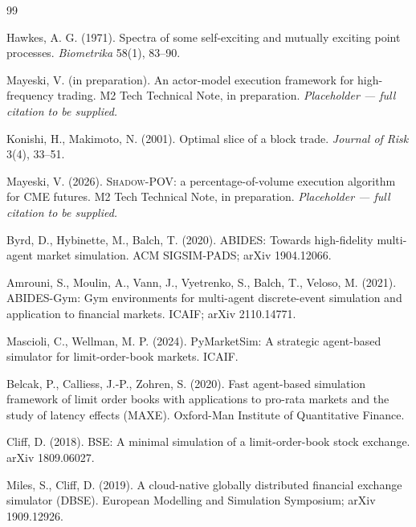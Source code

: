 \documentclass[11pt]{article}
\newcommand{\shadowpov}{\textsc{Shadow-POV}}
\begin{document}
\begin{thebibliography}{99}

Hawkes, A. G. (1971).
\newblock Spectra of some self-exciting and mutually exciting point processes.
\newblock \emph{Biometrika} 58(1), 83--90.

Mayeski, V. (in preparation).
\newblock An actor-model execution framework for high-frequency trading.
\newblock M2 Tech Technical Note, in preparation.
\newblock \emph{Placeholder --- full citation to be supplied.}

Konishi, H., Makimoto, N. (2001).
\newblock Optimal slice of a block trade.
\newblock \emph{Journal of Risk} 3(4), 33--51.

Mayeski, V. (2026).
\newblock \shadowpov{}: a percentage-of-volume execution algorithm for CME futures.
\newblock M2 Tech Technical Note, in preparation.
\newblock \emph{Placeholder --- full citation to be supplied.}

Byrd, D., Hybinette, M., Balch, T. (2020).
ABIDES: Towards high-fidelity multi-agent market simulation.
ACM SIGSIM-PADS; arXiv 1904.12066.

Amrouni, S., Moulin, A., Vann, J., Vyetrenko, S., Balch, T., Veloso, M. (2021).
ABIDES-Gym: Gym environments for multi-agent discrete-event simulation and application to financial markets.
ICAIF; arXiv 2110.14771.

Mascioli, C., Wellman, M. P. (2024).
PyMarketSim: A strategic agent-based simulator for limit-order-book markets.
ICAIF.

Belcak, P., Calliess, J.-P., Zohren, S. (2020).
Fast agent-based simulation framework of limit order books with applications to pro-rata markets and the study of latency effects (MAXE).
Oxford-Man Institute of Quantitative Finance.

Cliff, D. (2018).
BSE: A minimal simulation of a limit-order-book stock exchange.
arXiv 1809.06027.

Miles, S., Cliff, D. (2019).
A cloud-native globally distributed financial exchange simulator (DBSE).
European Modelling and Simulation Symposium; arXiv 1909.12926.


\end{thebibliography}
\end{document}
